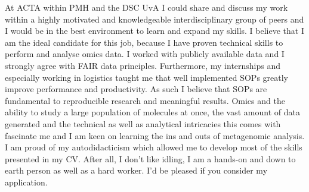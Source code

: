 \documentclass[11pt, a4paper]{awesome-cv}
\begin{document}
\begin{cvletter}
At ACTA within PMH and the DSC UvA I could share and discuss my work within a highly motivated and knowledgeable interdisciplinary group of peers and I would be in the best environment to learn and expand my skills.
I believe that I am the ideal candidate for this job, because I have proven technical skills to perform and analyse omics data. 
I worked with publicly available data and I strongly agree with FAIR data principles. 
Furthermore, my internships and especially working in logistics taught me that well implemented SOPs greatly improve performance and productivity. 
As such I believe that SOPs are fundamental to reproducible research and meaningful results. 
Omics and the ability to study a large population of molecules at once, the vast amount of data generated and the technical as well as analytical intricacies this comes with fascinate me and I am keen on learning the ins and outs of metagenomic analysis. 
I am proud of my autodidacticism which allowed me to develop most of the skills presented in my CV. 
After all, I don't like idling, I am a hands-on and down to earth person as well as a hard worker. 
I'd be pleased if you consider my application.
\end{cvletter}


\makeletterclosing
\end{document}
